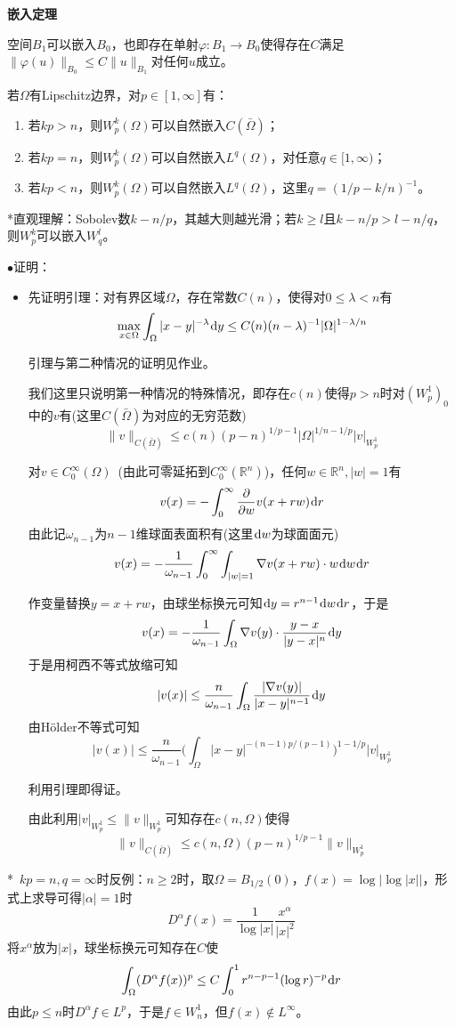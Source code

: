 \documentclass[a4paper,UTF8,fontset=windows]{ctexart}
\newcommand*{\dr}{\hspace{0.07em}\mathrm{d}}
\newcommand{\proo}[1]{{\kaishu $\bullet$证明：
\begin{itemize}
    \item[] #1
\end{itemize}
}}
\begin{document}
\textbf{嵌入定理}

空间$B_1$可以嵌入$B_0$，也即存在单射$\varphi:B_1\to B_0$使得存在$C$满足$\|\varphi(u)\|_{B_0}\le C\|u\|_{B_1}$对任何$u$成立。

若$\Omega$有Lipschitz边界，对$p\in[1,\infty]$有：
\begin{enumerate}
    \item 若$kp>n$，则$W_p^k(\Omega)$可以自然嵌入$C(\bar{\Omega})$；
    \item 若$kp=n$，则$W_p^k(\Omega)$可以自然嵌入$L^q(\Omega)$，对任意$q\in[1,\infty)$；
    \item 若$kp<n$，则$W_p^k(\Omega)$可以自然嵌入$L^q(\Omega)$，这里$q=(1/p-k/n)^{-1}$。
\end{enumerate}

*直观理解：Sobolev数$k-n/p$，其越大则越光滑；若$k\ge l$且$k-n/p>l-n/q$，则$W_p^k$可以嵌入$W_q^l$。

\proo{
    先证明引理：对有界区域$\Omega$，存在常数$C(n)$，使得对$0\le\lambda<n$有
    $$\max_{x\in\Omega}\int_\Omega|x-y|^{-\lambda}\dr y\le C(n)(n-\lambda)^{-1}|\Omega|^{1-\lambda/n}$$

    引理与第二种情况的证明见作业。

    我们这里只说明第一种情况的特殊情况，即存在$c(n)$使得$p>n$时对$(W_p^1)_0$中的$v$有(这里$C(\bar{\Omega})$为对应的无穷范数)
    $$\|v\|_{C(\bar{\Omega})}\le c(n)(p-n)^{1/p-1}|\Omega|^{1/n-1/p}|v|_{W_p^1}$$

    对$v\in C_0^\infty(\Omega)$\ (由此可零延拓到$C_0^\infty(\mathbb{R}^n)$)，任何$w\in\mathbb{R}^n,|w|=1$有
    $$v(x)=-\int_0^\infty\frac{\partial}{\partial w}v(x+rw)\dr r$$
    由此记$\omega_{n-1}$为$n-1$维球面表面积有(这里$\dr w$为球面面元)
    $$v(x)=-\frac{1}{\omega_{n-1}}\int_0^\infty\int_{|w|=1}\nabla v(x+rw)\cdot w\dr w\dr r$$

    作变量替换$y=x+rw$，由球坐标换元可知$\dr y=r^{n-1}\dr w\dr r$，于是
    $$v(x)=-\frac{1}{\omega_{n-1}}\int_\Omega\nabla v(y)\cdot\frac{y-x}{|y-x|^n}\dr y$$
    于是用柯西不等式放缩可知
    $$|v(x)|\le\frac{n}{\omega_{n-1}}\int_\Omega\frac{|\nabla v(y)|}{|x-y|^{n-1}}\dr y$$
    由H\"older不等式可知
    $$|v(x)|\le\frac{n}{\omega_{n-1}}\bigg(\int_{\Omega}|x-y|^{-(n-1)p/(p-1)}\bigg)^{1-1/p}|v|_{W_p^1}$$

    利用引理即得证。

    由此利用$|v|_{W_p^1}\le\|v\|_{W_p^1}$可知存在$c(n,\Omega)$使得
    $$\|v\|_{C(\bar{\Omega})}\le c(n,\Omega)(p-n)^{1/p-1}\|v\|_{W_p^1}$$
}

*\ $kp=n,q=\infty$时反例：$n\ge2$时，取$\Omega=B_{1/2}(0)$，$f(x)=\log|\log|x||$，形式上求导可得$|\alpha|=1$时
$$D^\alpha f(x)=\frac{1}{\log|x|}\frac{x^\alpha}{|x|^2}$$
将$x^\alpha$放为$|x|$，球坐标换元可知存在$C$使
$$\int_\Omega(D^\alpha f(x))^p\le C\int_0^1r^{n-p-1}(\log r)^{-p}\dr r$$
由此$p\le n$时$D^\alpha f\in L^p$，于是$f\in W_n^1$，但$f(x)\notin L^\infty$。
\end{document}
